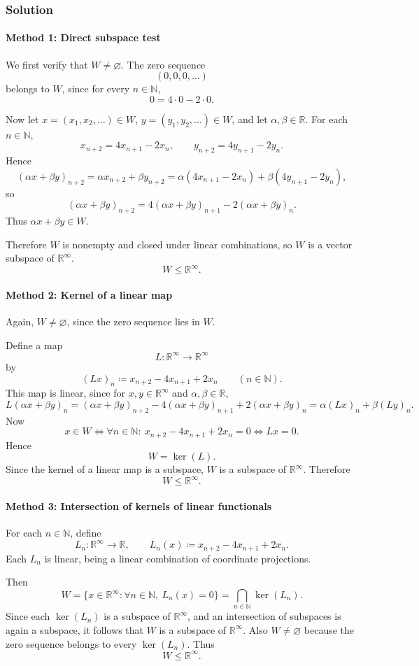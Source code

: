 \documentclass[12pt]{article}
\newcommand{\R}{\mathbb{R}}
\newcommand{\N}{\mathbb{N}}
\begin{document}
\subsubsection{Solution}

\paragraph{Method 1: Direct subspace test}
We first verify that \(W\neq\varnothing\). The zero sequence
\[
(0,0,0,\ldots)
\]
belongs to \(W\), since for every \(n\in\N\),
\[
0=4\cdot 0-2\cdot 0.
\]

Now let \(x=(x_1,x_2,\ldots)\in W\), \(y=(y_1,y_2,\ldots)\in W\), and let \(\alpha,\beta\in\R\). For each \(n\in\N\),
\[
x_{n+2}=4x_{n+1}-2x_n,
\qquad
y_{n+2}=4y_{n+1}-2y_n.
\]
Hence
\[
(\alpha x+\beta y)_{n+2}
=\alpha x_{n+2}+\beta y_{n+2}
=\alpha(4x_{n+1}-2x_n)+\beta(4y_{n+1}-2y_n),
\]
so
\[
(\alpha x+\beta y)_{n+2}
=4(\alpha x+\beta y)_{n+1}-2(\alpha x+\beta y)_n.
\]
Thus \(\alpha x+\beta y\in W\).

Therefore \(W\) is nonempty and closed under linear combinations, so \(W\) is a vector subspace of \(\R^\infty\).
\[
\boxed{W\le \R^\infty.}
\]

\paragraph{Method 2: Kernel of a linear map}
Again, \(W\neq\varnothing\), since the zero sequence lies in \(W\).

Define a map
\[
L:\R^\infty\to \R^\infty
\]
by
\[
(Lx)_n \coloneqq x_{n+2}-4x_{n+1}+2x_n
\qquad (n\in\N).
\]
This map is linear, since for \(x,y\in\R^\infty\) and \(\alpha,\beta\in\R\),
\[
L(\alpha x+\beta y)_n
=(\alpha x+\beta y)_{n+2}-4(\alpha x+\beta y)_{n+1}+2(\alpha x+\beta y)_n
=\alpha (Lx)_n+\beta (Ly)_n.
\]
Now
\[
x\in W
\iff \forall n\in\N:\ x_{n+2}-4x_{n+1}+2x_n=0
\iff Lx=0.
\]
Hence
\[
W=\ker(L).
\]
Since the kernel of a linear map is a subspace, \(W\) is a subspace of \(\R^\infty\). Therefore
\[
\boxed{W\le \R^\infty.}
\]

\paragraph{Method 3: Intersection of kernels of linear functionals}
For each \(n\in\N\), define
\[
L_n:\R^\infty\to \R,\qquad
L_n(x)\coloneqq x_{n+2}-4x_{n+1}+2x_n.
\]
Each \(L_n\) is linear, being a linear combination of coordinate projections.

Then
\[
W=\{x\in\R^\infty:\forall n\in\N,\ L_n(x)=0\}
=\bigcap_{n\in\N}\ker(L_n).
\]
Since each \(\ker(L_n)\) is a subspace of \(\R^\infty\), and an intersection of subspaces is again a subspace, it follows that \(W\) is a subspace of \(\R^\infty\). Also \(W\neq\varnothing\) because the zero sequence belongs to every \(\ker(L_n)\). Thus
\[
\boxed{W\le \R^\infty.}
\]
\end{document}
